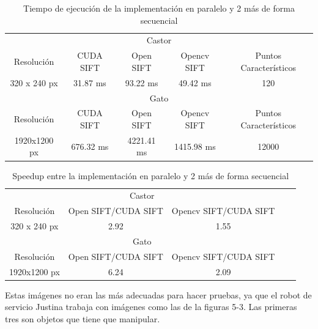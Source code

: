 \begin{table}[H]
\centering
\begin{tabular}{|c|c|c|c|c|}
\hline
\multicolumn{5}{|c|}{Castor} \\
\cline{1-5}
Resolución & CUDA SIFT & Open SIFT & Opencv SIFT & Puntos Característicos \\
\hline \hline
320 x 240 px & 31.87 ms   &   93.22 ms  &  49.42 ms   & 120\\ \cline{1-5}
\hline \hline
\multicolumn{5}{|c|}{Gato} \\
\cline{1-5}
Resolución & CUDA SIFT & Open SIFT & Opencv SIFT & Puntos Característicos \\
\hline \hline
1920x1200 px & 676.32 ms &  4221.41 ms & 1415.98 ms   & 12000\\ \cline{1-5}
\end{tabular}
\caption{Tiempo de ejecución de la implementación en paralelo y 2 más de forma secuencial}
\label{tabla:final}
\end{table}
\begin{table}[H]
\centering
\begin{tabular}{|c|c|c|c|c|}
\hline
\multicolumn{3}{|c|}{Castor} \\
\cline{1-3}
Resolución &  Open SIFT/CUDA SIFT & Opencv SIFT/CUDA SIFT  \\
\hline \hline
320 x 240 px & 2.92 & 1.55 \\ \cline{1-3}
\hline \hline
\multicolumn{3}{|c|}{Gato} \\
\cline{1-3}
Resolución & Open SIFT/CUDA SIFT & Opencv SIFT/CUDA SIFT\\
\hline \hline
1920x1200 px  & 6.24 & 2.09 \\ \cline{1-3}
\end{tabular}
\caption{ Speedup entre la implementación en paralelo y 2 más de forma secuencial}
\label{tabla:final}
\end{table}
Estas imágenes no eran las más adecuadas para hacer pruebas, ya que el robot de servicio Justina trabaja con imágenes como las de la figuras 5-3. Las primeras tres son objetos que tiene que manipular.\\
